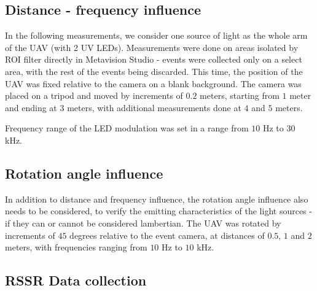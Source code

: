 \subsection{Distance - frequency influence}

In the following measurements, we consider one source of light as the whole arm of the UAV (with 2 UV LEDs). Measurements were
done on areas isolated by ROI filter directly in Metavision Studio - events were collected only on a select area, with the
rest of the events being discarded.
This time, the position of the UAV was fixed relative to the camera on a blank background. The camera was placed on a tripod
and moved by increments of $0.2$ meters, starting from $1$ meter and ending at $3$ meters, with additional measurements done
at $4$ and $5$ meters.

Frequency range of the LED modulation was set in a range from $10$ Hz to $30$ kHz.

\subsection{Rotation angle influence}

In addition to distance and frequency influence, the rotation angle influence also needs to be considered, to
verify the emitting characteristics of the light sources - if they can or cannot be considered lambertian.
The UAV was rotated by increments of $45$ degrees relative to the event camera, at distances of $0.5$, $1$ and $2$ meters,
with frequencies ranging from $10$ Hz to $10$ kHz. 

\subsection{RSSR Data collection}

